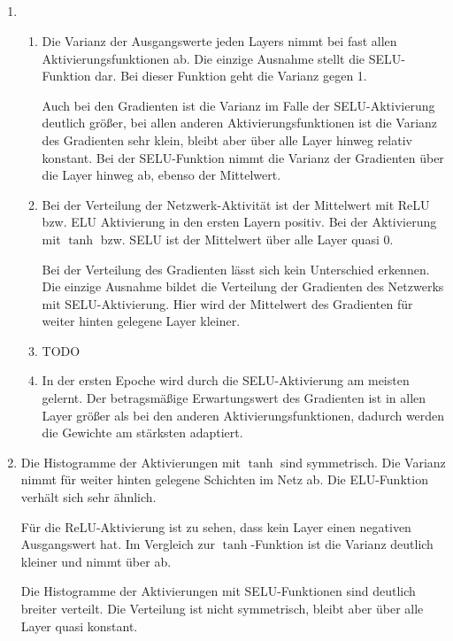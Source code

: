 \documentclass[DIN, pagenumber=false, fontsize=11pt, parskip=half]{scrartcl}
\begin{document}
    \subsection{}
    \begin{enumerate}[label=\alph*)]
        \item $ $
            \begin{enumerate}[label=\roman*.]
                \item Die Varianz der Ausgangswerte jeden Layers nimmt bei fast allen Aktivierungsfunktionen ab. Die einzige Ausnahme stellt die SELU-Funktion dar.
                    Bei dieser Funktion geht die Varianz gegen 1.

                    Auch bei den Gradienten ist die Varianz im Falle der SELU-Aktivierung deutlich größer, bei allen anderen Aktivierungsfunktionen ist die Varianz des Gradienten sehr klein, bleibt aber über alle Layer hinweg relativ konstant. Bei der SELU-Funktion nimmt die Varianz der Gradienten über die Layer hinweg ab, ebenso der Mittelwert.
                \item Bei der Verteilung der Netzwerk-Aktivität ist der Mittelwert mit ReLU bzw. ELU Aktivierung in den ersten Layern positiv. Bei der Aktivierung mit $\tanh$ bzw. SELU ist der Mittelwert über alle Layer quasi $0$.

                    Bei der Verteilung des Gradienten lässt sich kein Unterschied erkennen. Die einzige Ausnahme bildet die Verteilung der Gradienten des Netzwerks mit SELU-Aktivierung. Hier wird der Mittelwert des Gradienten für weiter hinten gelegene Layer kleiner.
                \item TODO
                \item In der ersten Epoche wird durch die SELU-Aktivierung am meisten gelernt. Der betragsmäßige Erwartungswert des Gradienten ist in allen Layer größer als bei den anderen Aktivierungsfunktionen, dadurch werden die Gewichte am stärksten adaptiert.
            \end{enumerate}
        \item 
            Die Histogramme der Aktivierungen mit $\tanh$ sind symmetrisch. Die Varianz nimmt für weiter hinten gelegene Schichten im Netz ab. Die ELU-Funktion verhält sich sehr ähnlich.

            Für die ReLU-Aktivierung ist zu sehen, dass kein Layer einen negativen Ausgangswert hat. Im Vergleich zur $\tanh$-Funktion ist die Varianz deutlich kleiner und nimmt über ab.

            Die Histogramme der Aktivierungen mit SELU-Funktionen sind deutlich breiter verteilt. Die Verteilung ist nicht symmetrisch, bleibt aber über alle Layer quasi konstant.
    \end{enumerate}
\end{document}
